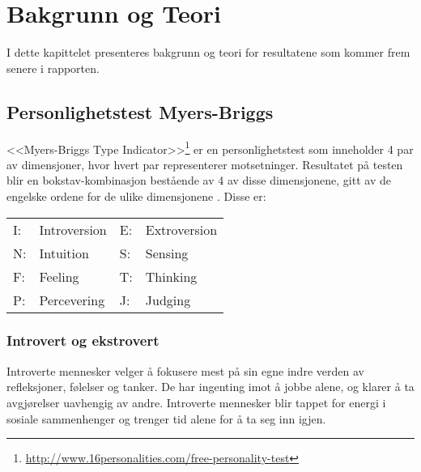 
\chapter{Bakgrunn og Teori} %

\label{ch:bakgrunnteori} %



I dette kapittelet presenteres bakgrunn og teori for resultatene som kommer frem senere i rapporten. 

\section{Personlighetstest Myers-Briggs}


<<Myers-Briggs Type Indicator>>\footnote{\url{http://www.16personalities.com/free-personality-test}} er en personlighetstest som inneholder 4 par av dimensjoner, hvor hvert par representerer motsetninger. Resultatet på testen blir en bokstav-kombinasjon bestående av 4 av disse dimensjonene, gitt av de engelske ordene for de ulike dimensjonene \cite{16personalities} \cite{MyersBriggs}. Disse er:

\begin{center}
\begin{tabular}{l l | l l}
I: & Introversion & E: & Extroversion \\
N: & Intuition    & S: & Sensing \\
F: & Feeling      & T: & Thinking \\
P: & Percevering  & J: & Judging \\
\end{tabular}
\end{center}


\subsection{Introvert og ekstrovert}

Introverte mennesker velger å fokusere mest på sin egne indre verden av refleksjoner, følelser og tanker. De har ingenting imot å jobbe alene, og klarer å ta avgjørelser uavhengig av andre. Introverte mennesker blir tappet for energi i sosiale sammenhenger og trenger tid alene for å ta seg inn igjen. 

